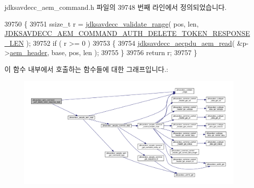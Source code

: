 jdksavdecc\+\_\+aem\+\_\+command.\+h 파일의 39748 번째 라인에서 정의되었습니다.


\begin{DoxyCode}
39750 \{
39751     ssize\_t r = \hyperlink{group__util_ga9c02bdfe76c69163647c3196db7a73a1}{jdksavdecc\_validate\_range}( pos, len, 
      \hyperlink{group__command__auth__delete__token__response_ga600215ee1f8fa3622c1d54cc28c1f11f}{JDKSAVDECC\_AEM\_COMMAND\_AUTH\_DELETE\_TOKEN\_RESPONSE\_LEN} 
      );
39752     \textcolor{keywordflow}{if} ( r >= 0 )
39753     \{
39754         \hyperlink{group__aecpdu__aem_gae2421015dcdce745b4f03832e12b4fb6}{jdksavdecc\_aecpdu\_aem\_read}( &p->\hyperlink{structjdksavdecc__aem__command__auth__delete__token__response_ae1e77ccb75ff5021ad923221eab38294}{aem\_header}, base, pos, len );
39755     \}
39756     \textcolor{keywordflow}{return} r;
39757 \}
\end{DoxyCode}


이 함수 내부에서 호출하는 함수들에 대한 그래프입니다.\+:
\nopagebreak
\begin{figure}[H]
\begin{center}
\leavevmode
\includegraphics[width=350pt]{group__command__auth__delete__token__response_gac6a9f33c151d0ad8a60234187af34350_cgraph}
\end{center}
\end{figure}


